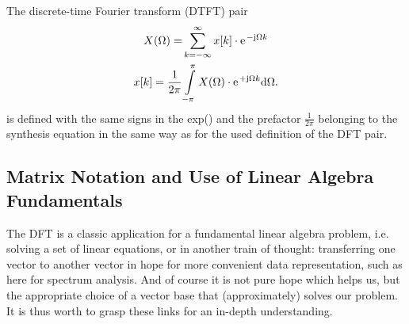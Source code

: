 \documentclass[11pt,a4paper,DIV=12]{scrartcl}
\begin{document}
The discrete-time Fourier transform (DTFT) pair
\begin{align}
X(\Omega)=&\sum_{k=-\infty}^\infty x[k]\cdot\e^{-\im\Omega k}
\label{eq:DTFT}\\
x[k]=\frac{1}{2\pi}&\int\limits_{-\pi}^\pi X(\Omega)\cdot\e^{+\im\Omega k}\text{d}\Omega.
\end{align}
is defined with the same signs in the exp() and the prefactor $\frac{1}{2\pi}$
belonging to the synthesis equation in the same way as for the used definition
of the DFT pair.

\subsection{Matrix Notation and Use of Linear Algebra Fundamentals}
The DFT is a classic application for a fundamental linear algebra problem, i.e.
solving a set of linear equations, or in another train of thought: transferring
one vector to another vector in hope for more convenient data representation,
such as here for spectrum analysis.
%
And of course it is not pure hope which helps us, but the appropriate choice
of a vector base that (approximately) solves our problem.
%
It is thus worth to grasp these links for an in-depth understanding.
\end{document}
